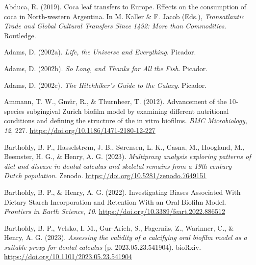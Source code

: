 \documentclass[
  b5paper,
]{book}
\newlength{\cslhangindent}
\newlength{\cslentryspacingunit} %
\newenvironment{CSLReferences}[2] %
 {%
  \setlength{\parindent}{0pt}
  \ifodd #1
  \let\oldpar\par
  \def\par{\hangindent=\cslhangindent\oldpar}
  \fi
  \setlength{\parskip}{#2\cslentryspacingunit}
 }%
 {}
\begin{document}

\leavevmode{}%
\cleardoublepage
{}
{}
\appendix

\hypertarget{refs-6}{}
\begin{CSLReferences}{1}{0}
\leavevmode{}%
Abduca, R. (2019). Coca leaf transfers to {Europe}. {Effects} on the
consumption of coca in {North-western Argentina}. In M. Kaller \& F.
Jacob (Eds.), \emph{Transatlantic {Trade} and {Global Cultural Transfers
Since} 1492: {More} than {Commodities}}. {Routledge}.

\leavevmode{}%
Adams, D. (2002a). \emph{Life, the {Universe} and {Everything}}.
{Picador}.

\leavevmode{}%
Adams, D. (2002b). \emph{So {Long}, and {Thanks} for {All} the {Fish}}.
{Picador}.

\leavevmode{}%
Adams, D. (2002c). \emph{The {Hitchhiker}'s {Guide} to the {Galaxy}}.
{Picador}.

\leavevmode{}%
Ammann, T. W., Gmür, R., \& Thurnheer, T. (2012). Advancement of the
10-species subgingival {Zurich} biofilm model by examining different
nutritional conditions and defining the structure of the in vitro
biofilms. \emph{BMC Microbiology}, \emph{12}, 227.
\url{https://doi.org/10.1186/1471-2180-12-227}

\leavevmode{}%
Bartholdy, B. P., Hasselstrøm, J. B., Sørensen, L. K., Casna, M.,
Hoogland, M., Beemster, H. G., \& Henry, A. G. (2023). \emph{Multiproxy
analysis exploring patterns of diet and disease in dental calculus and
skeletal remains from a 19th century {Dutch} population}. {Zenodo}.
\url{https://doi.org/10.5281/zenodo.7649151}

\leavevmode{}%
Bartholdy, B. P., \& Henry, A. G. (2022). Investigating {Biases
Associated With Dietary Starch Incorporation} and {Retention With} an
{Oral Biofilm Model}. \emph{Frontiers in Earth Science}, \emph{10}.
\url{https://doi.org/10.3389/feart.2022.886512}

\leavevmode{}%
Bartholdy, B. P., Velsko, I. M., Gur-Arieh, S., Fagernäs, Z., Warinner,
C., \& Henry, A. G. (2023). \emph{Assessing the validity of a calcifying
oral biofilm model as a suitable proxy for dental calculus} (p.
2023.05.23.541904). {bioRxiv}.
\url{https://doi.org/10.1101/2023.05.23.541904}


\end{CSLReferences}
\end{document}
